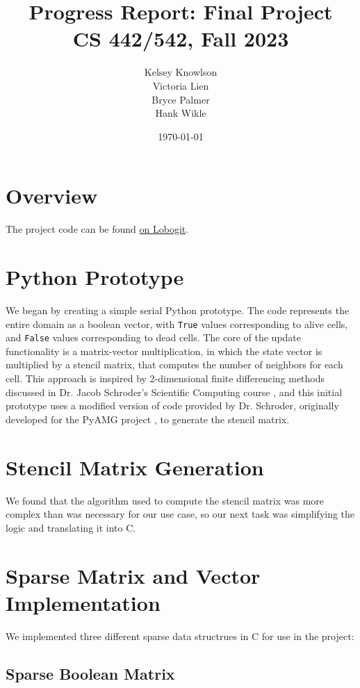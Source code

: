 \documentclass[12pt]{article}
\title{Progress Report: Final Project \\ CS 442/542, Fall 2023}
\author{
        Kelsey Knowlson \\
        Victoria Lien \\ 
        Bryce Palmer \\
        Hank Wikle
}
\date{\today}   %
\begin{document}
\maketitle
\clearpage

\section{Overview}

The project code can be found \href{https://lobogit.unm.edu/hwikle/game-of-life}{on Lobogit}.

\section{Python Prototype}

We began by creating a simple serial Python prototype. The code represents the entire domain as a boolean vector, with \texttt{True} values corresponding to alive cells, and \texttt{False} values corresponding to dead cells. The core of the update functionality is a matrix-vector multiplication, in which the state vector is multiplied by a stencil matrix, that computes the number of neighbors for each cell. This approach is inspired by 2-dimensional finite differencing methods discussed in Dr. Jacob Schroder's Scientific Computing course \cite{cs471}, and this initial prototype uses a modified version of code provided by Dr. Schroder, originally developed for the PyAMG project \cite{pyamg2023}, to generate the stencil matrix.

\section{Stencil Matrix Generation}

We found that the algorithm used to compute the stencil matrix was more complex than was necessary for our use case, so our next task was simplifying the logic and translating it into C.

\section{Sparse Matrix and Vector Implementation}

We implemented three different sparse data structrues in C for use in the project:
 
\subsection{Sparse Boolean Matrix}
\end{document}
